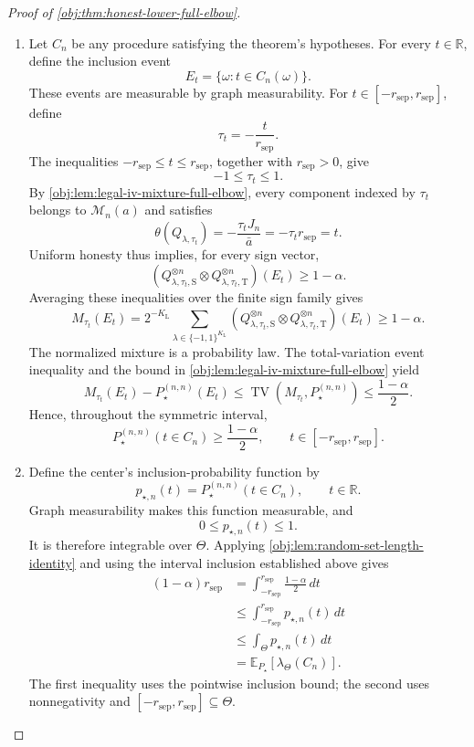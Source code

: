 \begin{proof}[Proof of \cref{obj:thm:honest-lower-full-elbow}]
\begin{enumerate}
\item Let \(C_n\) be any procedure satisfying the theorem's hypotheses. For every \(t\in\mathbb R\), define the inclusion event
\[
E_t=\{\omega:t\in C_n(\omega)\}.
\]
These events are measurable by graph measurability. For \(t\in[-r_{\mathrm{sep}},r_{\mathrm{sep}}]\), define
\[
\tau_t=-\frac{t}{r_{\mathrm{sep}}}.
\]
The inequalities \(-r_{\mathrm{sep}}\le t\le r_{\mathrm{sep}}\), together with \(r_{\mathrm{sep}}>0\), give
\[
-1\le\tau_t\le1.
\]
By \cref{obj:lem:legal-iv-mixture-full-elbow}, every component indexed by \(\tau_t\) belongs to \(\mathcal M_n(a)\) and satisfies
\[
\theta(Q_{\lambda,\tau_t})
=-\frac{\tau_tJ_n}{\bar a}
=-\tau_t r_{\mathrm{sep}}
=t.
\]
Uniform honesty thus implies, for every sign vector,
\[
\left(
Q_{\lambda,\tau_t,\mathrm S}^{\otimes n}
\otimes Q_{\lambda,\tau_t,\mathrm T}^{\otimes n}
\right)(E_t)\ge1-\alpha.
\]
Averaging these inequalities over the finite sign family gives
\[
M_{\tau_t}(E_t)
=
2^{-K_{\mathrm L}}
\sum_{\lambda\in\{-1,1\}^{K_{\mathrm L}}}
\left(
Q_{\lambda,\tau_t,\mathrm S}^{\otimes n}
\otimes Q_{\lambda,\tau_t,\mathrm T}^{\otimes n}
\right)(E_t)
\ge1-\alpha.
\]
The normalized mixture is a probability law. The total-variation event inequality and the bound in \cref{obj:lem:legal-iv-mixture-full-elbow} yield
\[
M_{\tau_t}(E_t)-P_{\star}^{(n,n)}(E_t)
\le
\operatorname{TV}(M_{\tau_t},P_{\star}^{(n,n)})
\le\frac{1-\alpha}{2}.
\]
Hence, throughout the symmetric interval,
\[
P_{\star}^{(n,n)}(t\in C_n)
\ge\frac{1-\alpha}{2},
\qquad
t\in[-r_{\mathrm{sep}},r_{\mathrm{sep}}].
\]

\item Define the center's inclusion-probability function by
\[
p_{\star,n}(t)=P_{\star}^{(n,n)}(t\in C_n),
\qquad t\in\mathbb R.
\]
Graph measurability makes this function measurable, and
\[
0\le p_{\star,n}(t)\le1.
\]
It is therefore integrable over \(\Theta\). Applying \cref{obj:lem:random-set-length-identity} and using the interval inclusion established above gives
\[
\begin{aligned}
(1-\alpha)r_{\mathrm{sep}}
&=\int_{-r_{\mathrm{sep}}}^{r_{\mathrm{sep}}}
       \frac{1-\alpha}{2}\,dt\\
&\le\int_{-r_{\mathrm{sep}}}^{r_{\mathrm{sep}}}
       p_{\star,n}(t)\,dt\\
&\le\int_{\Theta}p_{\star,n}(t)\,dt\\
&=\mathbb E_{P_{\star}}
       \!\left[\lambda_{\Theta}(C_n)\right].
\end{aligned}
\]
The first inequality uses the pointwise inclusion bound; the second uses nonnegativity and
\([-r_{\mathrm{sep}},r_{\mathrm{sep}}]\subseteq\Theta\).


\end{enumerate}
\end{proof}
